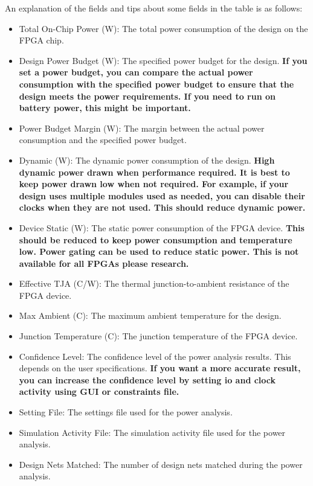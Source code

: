 \documentclass{report}
\begin{document}
An explanation of the fields and tips about some fields in the table is as follows:
\begin{itemize}
    \item Total On-Chip Power (W): The total power consumption of the design on the FPGA chip.
    \item Design Power Budget (W): The specified power budget for the design. \textbf{If you set a power budget, you can compare the actual power consumption with the specified power budget to ensure that the design meets the power requirements. If you need to run on battery power, this might be important.}
    \item Power Budget Margin (W): The margin between the actual power consumption and the specified power budget.
    \item Dynamic (W): The dynamic power consumption of the design. \textbf{High dynamic power drawn when performance required. It is best to keep power drawn low when not required. For example, if your design uses multiple modules used as needed, you can disable their clocks when they are not used. This should reduce dynamic power.}
    \item Device Static (W): The static power consumption of the FPGA device. \textbf{This should be reduced to keep power consumption and temperature low. Power gating can be used to reduce static power. This is not available for all FPGAs please research.}
    \item Effective TJA (C/W): The thermal junction-to-ambient resistance of the FPGA device.
    \item Max Ambient (C): The maximum ambient temperature for the design.
    \item Junction Temperature (C): The junction temperature of the FPGA device.
    \item Confidence Level: The confidence level of the power analysis results. This depends on the user specifications. \textbf{If you want a more accurate result, you can increase the confidence level by setting io and clock activity using GUI or constraints file.}
    \item Setting File: The settings file used for the power analysis.
    \item Simulation Activity File: The simulation activity file used for the power analysis.
    \item Design Nets Matched: The number of design nets matched during the power analysis.
\end{itemize}
\end{document}

